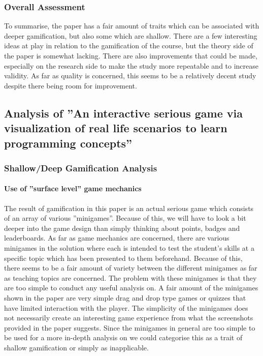 \subsubsection{Overall Assessment}
To summarise, the paper has a fair amount of traits which can be associated with deeper gamification, but also some which are shallow. There are a few interesting ideas at play in relation to the gamification of the course, but the theory side of the paper is somewhat lacking. There are also improvements that could be made, especially on the research side to make the study more repeatable and to increase validity. As far as quality is concerned, this seems to be a relatively decent study despite there being room for improvement. 




\subsection{Analysis of ''An interactive serious game via visualization of real life scenarios to learn programming concepts''}
\subsubsection{Shallow/Deep Gamification Analysis}
\paragraph{Use of ''surface level'' game mechanics}
The result of gamification in this paper is an actual serious game which consists of an array of various ''minigames''. Because of this, we will have to look a bit deeper into the game design than simply thinking about points, badges and leaderboards. As far as game mechanics are concerned, there are various minigames in the solution where each is intended to test the student's skills at a specific topic which has been presented to them beforehand. Because of this, there seems to be a fair amount of variety between the different minigames as far as teaching topics are concerned. The problem with these minigames is that they are too simple to conduct any useful analysis on. A fair amount of the minigames shown in the paper are very simple drag and drop type games or quizzes that have limited interaction with the player. The simplicity of the minigames does not necessarily create an interesting game experience from what the screenshots provided in the paper suggests. Since the minigames in general are too simple to be used for a more in-depth analysis on we could categorise this as a trait of shallow gamification or simply as inapplicable. 

